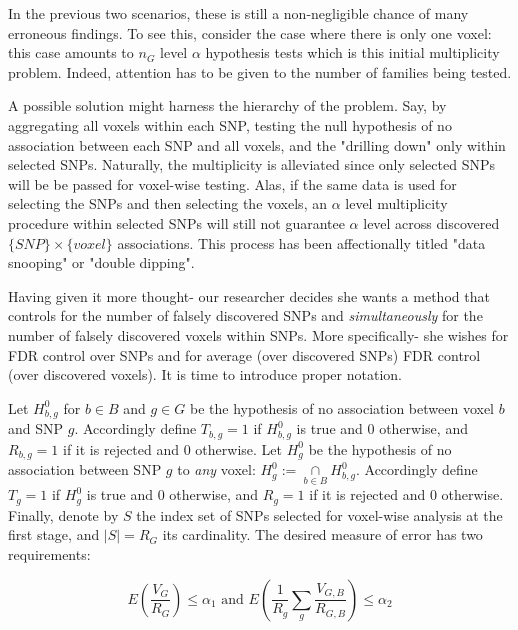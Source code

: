 \documentclass[draft,12pt]{article}
\begin{document}
In the previous two scenarios, these is still a non-negligible chance of many erroneous findings. To see this, consider the case where there is only one voxel: this case amounts to $n_G$ level $\alpha$ hypothesis tests which is this initial multiplicity problem. Indeed, attention has to be given to the number of families being tested. 

A possible solution might harness the hierarchy of the problem. Say, by aggregating all voxels within each SNP, testing the null hypothesis of no association between each SNP and all voxels, and the "drilling down" only within selected SNPs. Naturally, the multiplicity is alleviated since only selected SNPs will be be passed for voxel-wise testing. Alas, if the same data is used for selecting the SNPs and then selecting the voxels, an $\alpha$ level multiplicity procedure within selected SNPs will still not guarantee $\alpha$ level across discovered $\{SNP\} \times \{voxel\}$ associations. This process has been affectionally titled "data snooping" or "double dipping". 

Having given it more thought- our researcher decides she wants a method that controls for the number of falsely discovered SNPs and \emph{simultaneously} for the number of falsely discovered voxels within SNPs. More specifically- she wishes for FDR control over SNPs and for average (over discovered SNPs) FDR control (over discovered voxels). It is time to introduce proper notation.


Let $H^0_{b,g}$ for $b \in B$ and $g \in G$ be the hypothesis of no association between voxel $b$ and SNP $g$. 
Accordingly define $T_{b,g}=1$ if $H^0_{b,g}$ is true and 0 otherwise, and $R_{b,g}=1$ if it is rejected and 0 otherwise. Let $H^0_g$ be the hypothesis of no association between SNP $g$ to \emph{any} voxel: $ H^0_g:= \underset{b\in B}{\cap} H^0_{b,g}$.  
Accordingly define $T_{g}=1$ if $H^0_{g}$ is true and 0 otherwise, and $R_{g}=1$ if it is rejected and 0 otherwise. 
Finally, denote by $S$ the index set of SNPs selected for voxel-wise analysis at the first stage, and $\left| S \right|=R_G$ its cardinality. The desired measure of error has two requirements: 


\begin{equation} \label{eq:hirarchial_error}
 E \left(\frac{V_G}{R_G} \right)\leq \alpha_1 
\text{ and } 
E \left( \frac{1}{R_g}\sum_{g} \frac{V_{G,B}}{R_{G,B}} \right)\leq \alpha_2
\end{equation}
\end{document}
